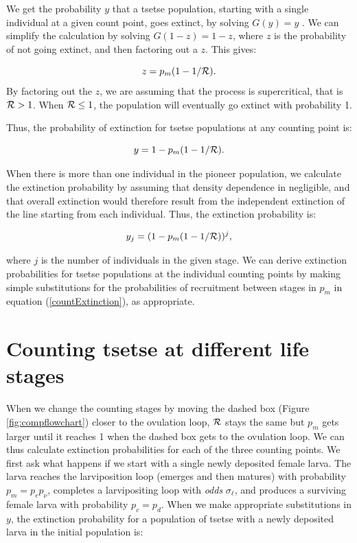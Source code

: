 \documentclass[smallextended]{svjour3}
\begin{document}
	We get the probability $y$ that a tsetse population, starting with a single individual at a given count point, goes extinct, by solving $G(y) = y$ \cite{bartlett1949some}. We can simplify the calculation by solving   $G(1-z) = 1-z$, where $z$ is the probability of not going extinct, and then factoring out a $z$. This gives:
	
	$$ z = p_m(1-1/{\cal R}).$$  
	By factoring out the $z$, we are assuming that the process is supercritical, that is ${\cal R} > 1$. When ${\cal R} \leq 1$, the population will eventually go extinct with probability 1. 
	
	Thus, the probability of extinction for tsetse populations at any counting point is:
	
	\begin{equation}
		\label{countExtinction}	
		y = 1 - p_m(1-1/{\cal R}).	
	\end{equation}
	
	When there is more than one individual in the pioneer population, we calculate the extinction probability by assuming that density dependence in negligible, and that overall extinction would therefore result from the independent extinction of the line starting from each individual. Thus, the extinction probability is:
	
	$$y_j = (1 - p_m(1-1/{\cal R}))^j,$$
	
	where $j$ is the number of individuals in the given stage. We can derive extinction probabilities for tsetse populations at the individual counting points by making simple substitutions for the probabilities of recruitment  between stages in $p_m$  in equation (\ref{countExtinction}), as appropriate. 
	
	\section{Counting tsetse at different life stages}
	
	When we change the counting stages by moving the dashed box (Figure \ref{fig:compflowchart}) closer to the ovulation loop, ${\cal R}$ stays the same but $p_m$ gets larger until it reaches 1 when the dashed box gets to the ovulation loop. We can thus calculate extinction probabilities for each of  the three counting points. We first ask what happens if we start with a single newly deposited female larva.
	The larva reaches the larviposition loop (emerges and then matures) with probability $p_m = p_e p_{\nu}$, completes a larvipositing loop with \textit{odds} $\sigma_\ell$, and produces a surviving female larva with probability $p_c = p_d$. 
	When we make appropriate substitutions in $y$, the extinction probability for a population of tsetse with a newly deposited larva in the initial population is:
	
\end{document}
